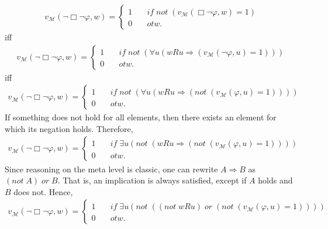 \documentclass[11pt,a4paper]{article}
\newcommand{\all}{\Box}
\begin{document}
\begin{equation*}
\begin{split}
v_{\mathcal{M}}(\neg \all \neg \varphi, w)=
\begin{cases}
1 & \quad \mathit{if}  \; \mathit{not} \; (v_{\mathcal{M}}(\all \neg \varphi, w)=1) \\
0 & \quad otw.
\end{cases}
\end{split}
\end{equation*}
iff
\begin{equation*}
\begin{split}
v_{\mathcal{M}}(\neg \all \neg \varphi, w)=
\begin{cases}
1 & \quad \mathit{if}  \; \mathit{not} \; (\forall u ( wRu  \Rightarrow (v_{\mathcal{M}}(\neg \varphi, u)=1))) \\
0 & \quad otw.
\end{cases}
\end{split}
\end{equation*}
iff
\begin{equation*}
\begin{split}
v_{\mathcal{M}}(\neg \all \neg \varphi, w)=
\begin{cases}
1 & \quad \mathit{if}  \; \mathit{not} \; (\forall u ( wRu  \Rightarrow (not \; (v_{\mathcal{M}}(\varphi, u)=1)))) \\
0 & \quad otw.
\end{cases}
\end{split}
\end{equation*}
If something does not hold for all elements, then there exists an element for which its negation holds. Therefore, 
\begin{equation*}
\begin{split}
v_{\mathcal{M}}(\neg \all \neg \varphi, w)=
\begin{cases}
1 & \quad \mathit{if}  \;  \exists u (not \; ( wRu  \Rightarrow (not \; (v_{\mathcal{M}}(\varphi, u)=1)))) \\
0 & \quad otw.
\end{cases}
\end{split}
\end{equation*}
Since reasoning on the meta level is classic, one can rewrite $A \Rightarrow B$ as $(not \; A) \; or \; B$. That is, an implication is always satisfied, except if $A$ holds and $B$ does not. Hence,
\begin{equation*}
\begin{split}
v_{\mathcal{M}}(\neg \all \neg \varphi, w)=
\begin{cases}
1 & \quad \mathit{if}  \;  \exists u (not \; ( (not \; wRu) \; or \; (not \; (v_{\mathcal{M}}(\varphi, u)=1)))) \\
0 & \quad otw.
\end{cases}
\end{split}
\end{equation*}
\end{document}
